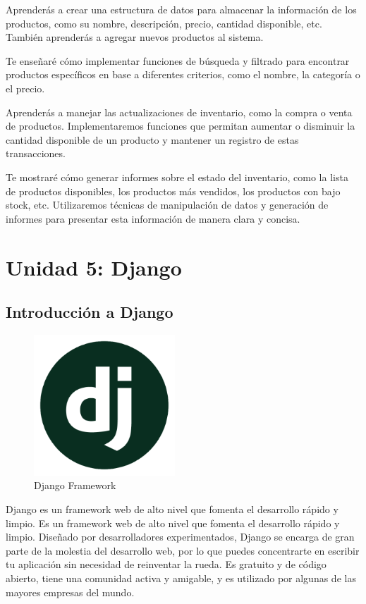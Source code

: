 \documentclass[
  a4paper,
  DIV=11,
  numbers=noendperiod,
  onepage,
  openany]{scrreprt}
\begin{document}
\begin{tcolorbox}
Aprenderás a crear una estructura de datos para almacenar la información
de los productos, como su nombre, descripción, precio, cantidad
disponible, etc. También aprenderás a agregar nuevos productos al
sistema.

Te enseñaré cómo implementar funciones de búsqueda y filtrado para
encontrar productos específicos en base a diferentes criterios, como el
nombre, la categoría o el precio.

Aprenderás a manejar las actualizaciones de inventario, como la compra o
venta de productos. Implementaremos funciones que permitan aumentar o
disminuir la cantidad disponible de un producto y mantener un registro
de estas transacciones.

Te mostraré cómo generar informes sobre el estado del inventario, como
la lista de productos disponibles, los productos más vendidos, los
productos con bajo stock, etc. Utilizaremos técnicas de manipulación de
datos y generación de informes para presentar esta información de manera
clara y concisa.

\part{Unidad 5: Django}

\chapter{Introducción a Django}\label{introducciuxf3n-a-django}

\begin{figure}[H]

{\centering \includegraphics[width=2.08333in,height=\textheight]{images/django-logo.png}

}

\caption{Django Framework}

\end{figure}%

Django es un framework web de alto nivel que fomenta el desarrollo
rápido y limpio. Es un framework web de alto nivel que fomenta el
desarrollo rápido y limpio. Diseñado por desarrolladores experimentados,
Django se encarga de gran parte de la molestia del desarrollo web, por
lo que puedes concentrarte en escribir tu aplicación sin necesidad de
reinventar la rueda. Es gratuito y de código abierto, tiene una
comunidad activa y amigable, y es utilizado por algunas de las mayores
empresas del mundo.


\end{tcolorbox}
\end{document}

